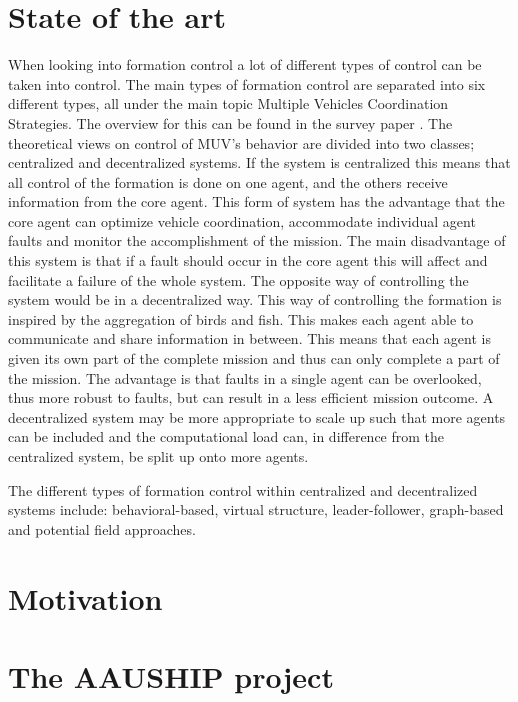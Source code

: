 \section{State of the art}
When looking into formation control a lot of different types of control can be taken into control. The main types of formation control are separated into six different types, all under the main topic Multiple Vehicles Coordination Strategies. The overview for this can be found in the survey paper \cite{muv-survey}. The theoretical views on control of \ac{MUV}'s behavior are divided into two classes; centralized and decentralized systems. If the system is centralized this means that all control of the formation is done on one agent, and the others receive information from the core agent. This form of system has the advantage that the core agent can optimize vehicle coordination, accommodate individual agent faults and monitor the accomplishment of the mission. The main disadvantage of this system is that if a fault should occur in the core agent this will affect and facilitate a failure of the whole system. The opposite way of controlling the system would be in a decentralized way. This way of controlling the formation is inspired by the aggregation of birds and fish. This makes each agent able to communicate and share information in between. This means that each agent is given its own part of the complete mission and thus can only complete a part of the mission. The advantage is that faults in a single agent can be overlooked, thus more robust to faults, but can result in a less efficient mission outcome. A decentralized system may be more appropriate to scale up such that more agents can be included and the computational load can, in difference from the centralized system, be split up onto more agents.

The different types of formation control within centralized and decentralized systems include: behavioral-based, virtual structure, leader-follower, graph-based and potential field approaches.

\section{Motivation}

\section{The AAUSHIP project}


